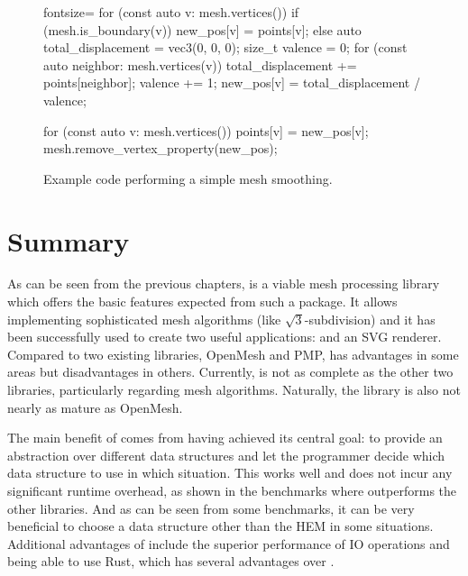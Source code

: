 \begin{figure}[p]
\begin{minipage}{.9\textwidth}
\begin{cppcode*}{fontsize=\footnotesize}
      for (const auto v: mesh.vertices()) {
          if (mesh.is_boundary(v)) {
              new_pos[v] = points[v];
          } else {
              auto total_displacement = vec3(0, 0, 0);
              size_t valence = 0;
              for (const auto neighbor: mesh.vertices(v)) {
                  total_displacement += points[neighbor];
                  valence += 1;
              }
              new_pos[v] = total_displacement / valence;
          }
      }

      for (const auto v: mesh.vertices()) {
          points[v] = new_pos[v];
      }
      mesh.remove_vertex_property(new_pos);
    \end{cppcode*}
  \end{minipage}

  \caption{
    Example code performing a simple mesh smoothing.
  }
  \label{fig:example-smooth}
\end{figure}


\newpage
\section{Summary}

As can be seen from the previous chapters,  is a viable mesh processing library which offers the basic features expected from such a package.
It allows implementing sophisticated mesh algorithms (like $\sqrt{3}$-subdivision) and it has been successfully used to create two useful applications:  and an SVG renderer.
Compared to two existing \cpp libraries, OpenMesh and PMP,  has advantages in some areas but disadvantages in others.
Currently,  is not as complete as the other two libraries, particularly regarding mesh algorithms.
Naturally, the library is also not nearly as mature as OpenMesh.

The main benefit of  comes from having achieved its central goal:
to provide an abstraction over different data structures and let the programmer decide which data structure to use in which situation.
This works well and does not incur any significant runtime overhead, as shown in the benchmarks where  outperforms the other libraries.
And as can be seen from some benchmarks, it can be very beneficial to choose a data structure other than the HEM in some situations.
Additional advantages of  include the superior performance of IO operations and being able to use Rust, which has several advantages over \cpp.

